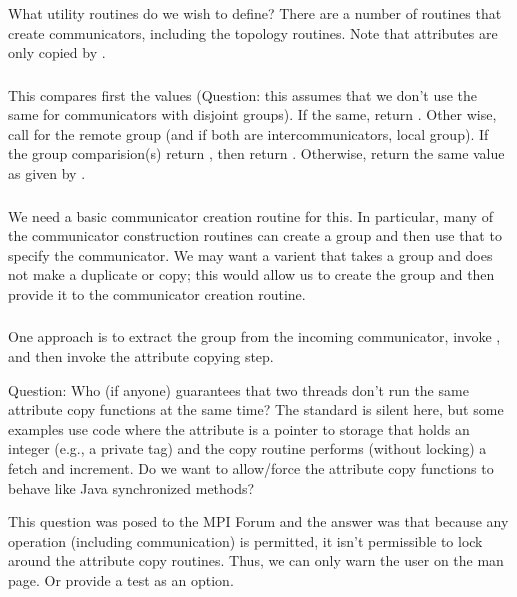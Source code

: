\documentclass{article}
\begin{document}
What utility routines do we wish to define?  There are a number of
routines that create communicators, including the topology routines.
Note that attributes are only copied by .

\subsubsection{}
This compares first the  values (Question:
this assumes that 
we don't use the same  for communicators
with disjoint 
groups).  If the same, return .  Other wise, call
 for the remote group (and if both are
intercommunicators, local group).  If the group comparision(s) return
, then return .  Otherwise, return
the same value as given by .

\subsubsection{}
We need a basic communicator creation routine for this.  In
particular, many of the communicator construction routines can create
a group and then use that to specify the communicator.  We may want a
varient that takes a group and does not make a duplicate or copy; this
would allow us to create the group and then provide it to the
communicator creation routine.

\subsubsection{}
One approach is to extract the group from the incoming communicator,
invoke , and then invoke the attribute
copying step.

Question: Who (if anyone) guarantees that two threads don't run the same
attribute copy functions at the same time?  The standard is silent here, but
some examples use code where the attribute is a pointer to storage that holds
an integer (e.g., a private tag) and the copy routine performs (without
locking) a fetch and increment.  Do we want to allow/force the attribute copy
functions to behave like Java synchronized methods?

This question was posed to the MPI Forum and the answer was that
because any operation (including communication) is permitted, it isn't
permissible to lock around the attribute copy routines.  Thus, we can
only warn the user on the man page.  Or provide a test as an option.
\end{document}
